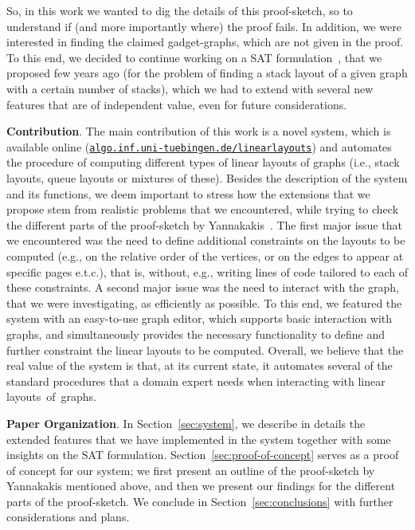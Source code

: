 \documentclass[runningheads]{llncs}
\newcommand{\myparagraph}[1]{\medskip\noindent\textbf{#1}.}
\newcommand\rurl[1]{\href{http://#1}{\nolinkurl{#1}}}
\begin{document}
So, in this work we wanted to dig the details of this proof-sketch, so to understand if (and more importantly where) the proof fails. In addition, we were interested in finding the claimed gadget-graphs, which are not given in the proof. To this end, we decided to continue working on a SAT formulation~\cite{DBLP:conf/gd/Bekos0Z15}, that we proposed few years ago (for the problem of finding a stack layout of a given graph with a certain number of stacks), which we had to extend with several new features that are of independent value, even for future considerations.

\myparagraph{Contribution} The main contribution of this work is a novel system, which is available online (\rurl{algo.inf.uni-tuebingen.de/linearlayouts}) and automates the procedure of computing different types of linear layouts of graphs (i.e., stack layouts, queue layouts or mixtures of these). Besides the description of the system and its functions, we deem important to stress how the extensions that we propose stem from realistic problems that we encountered, while trying to check the different parts of the proof-sketch by Yannakakis~\cite{DBLP:conf/stoc/Yannakakis86}. The first major issue that we encountered was the need to define additional constraints  on the layouts to be computed (e.g., on the relative order of the vertices, or on the edges to appear at specific pages e.t.c.), that is, without, e.g., writing lines of code tailored to each of these constraints. A second major issue was the need to interact with the graph, that we were investigating, as efficiently as possible. To this end, we featured the system with an easy-to-use graph editor, which supports basic interaction with graphs, and simultaneously provides the necessary functionality to define and further constraint the linear layouts to be computed. Overall, we believe that the real value of the system is that, at its current state, it automates several of the standard procedures that a domain expert needs when interacting with linear layouts~of~graphs.

\myparagraph{Paper Organization} In Section~\ref{sec:system}, we describe in details the extended features that we have implemented in the system together with some insights on the SAT formulation. Section~\ref{sec:proof-of-concept} serves as a proof of concept for our system; we first present an outline of the  proof-sketch by Yannakakis mentioned above, and then we present our findings for the different parts of the proof-sketch. We conclude in Section~\ref{sec:conclusions} with further considerations and plans.
\end{document}
